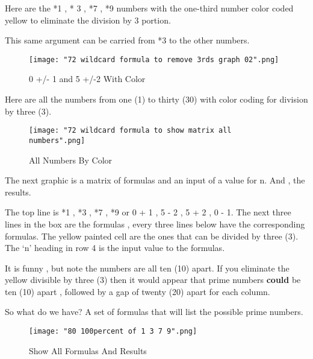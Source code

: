 \documentclass[12pt,letterpaper,oneside,titlepage]{article}
\begin{document}
\par 
Here are the *1 , * 3 , *7 , *9 numbers with the one-third number color coded yellow to eliminate the division by 3 portion.
\\ 
\par 
This same argument can be carried from *3 to the other numbers.
\begin{figure}[h]
	\centering
	\texttt{[image: "72 wildcard formula to remove 3rds graph 02".png]}
	\caption{0 +/- 1 and 5 +/-2 With Color}
\end{figure}
\pagebreak



\par 
Here are all the numbers from one (1) to thirty (30) with color coding for division by three (3).
\begin{figure}[h]
	\centering
	\texttt{[image: "72 wildcard formula to show matrix all numbers".png]}
	\caption{All Numbers By Color}
\end{figure}
\pagebreak


\par 
The next graphic is a matrix of formulas and an input of a value for n. And , the results.
\\
\par 
The top line is *1 , *3 , *7 , *9  or  0 + 1 , 5 - 2 , 5 + 2 , 0 - 1. 
The next three lines in the box are the formulas , every three lines below have the corresponding formulas.
The yellow painted cell are the ones that can be divided by three (3). The `n' heading in row 4 is the input value to the formulas. 
\\
\par 
It is funny , but note the numbers are all ten (10) apart. If you eliminate the yellow divisible by three (3) then it would appear that prime numbers \textbf{could} be ten (10) apart , followed by a gap of twenty (20)  apart for each column.
\\
\par 
So what do we have? A set of formulas that will list the possible prime numbers.

\begin{figure}[h]
	\centering
	\texttt{[image: "80 100percent of 1 3 7 9".png]}
	\caption{Show All Formulas And Results}
\end{figure}
\pagebreak
\end{document}
